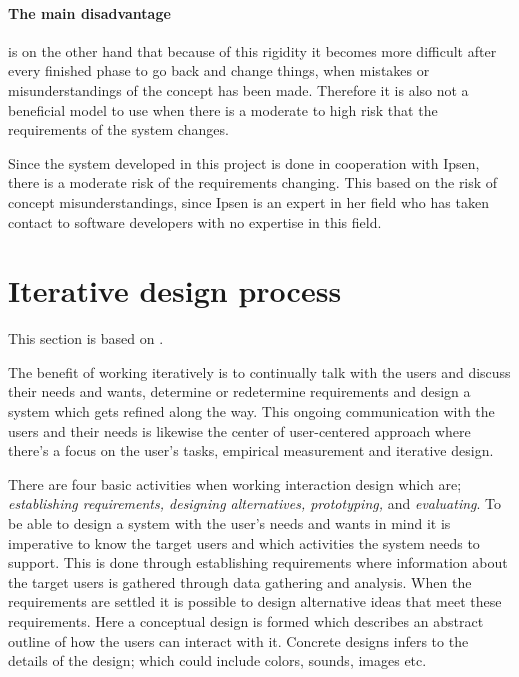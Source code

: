 \paragraph{The main disadvantage} is on the other hand that because of this rigidity it becomes more difficult after every finished phase to go back and change things, when mistakes or misunderstandings of the concept has been made.
Therefore it is also not a beneficial model to use when there is a moderate to high risk that the requirements of the system changes.

Since the system developed in this project is done in cooperation with Ipsen, there is a moderate risk of the requirements changing.
This based on the risk of concept misunderstandings, since Ipsen is an expert in her field who has taken contact to software developers with no expertise in this field.

\section{Iterative design process} \label{sec:iterativ}
This section is based on \cite{InteractionDesign,Rod-Aalborg,Iterative-Toolsqa}.


The benefit of working iteratively is to continually talk with the users and discuss their needs and wants, determine or redetermine requirements and design a system which gets refined along the way.
This ongoing communication with the users and their needs is likewise the center of user-centered approach where there’s a focus on the user’s tasks, empirical measurement and iterative design.

There are four basic activities when working interaction design which are;
\textit{establishing requirements, designing alternatives, prototyping,} and \textit{evaluating}.
To be able to design a system with the user’s needs and wants in mind it is imperative to know the target users and which activities the system needs to support.
This is done through establishing requirements where information about the target users is gathered through data gathering and analysis.
When the requirements are settled it is possible to design alternative ideas that meet these requirements.
Here a conceptual design is formed which describes an abstract outline of how the users can interact with it.
Concrete designs infers to the details of the design; which could include colors, sounds, images etc. 

